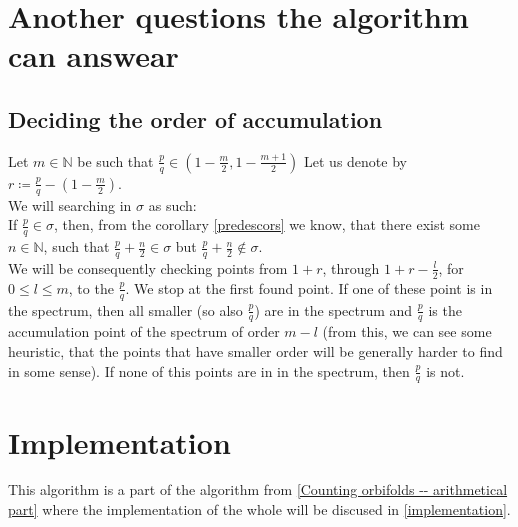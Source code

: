 \section{Another questions the algorithm can answear}
\subsection{Deciding the order of accumulation}
Let $m \in \mathbb{N}$ be such that $\frac{p}{q} \in (1-\frac{m}{2},1-
\frac{m+1}{2})$
Let us denote by $r \coloneqq \frac{p}{q} - (1-\frac{m}{2})$. \\ 

We will searching in $\sigma$ as such: \\

If $\frac{p}{q} \in \sigma$, then, from the corollary \ref{predescors} we know, that there 
exist some $n \in \mathbb{N}$, such that $\frac{p}{q} + \frac{n}{2} \in \sigma$ but 
$\frac{p}{q} + \frac{n}{2} \not\in \sigma$. \\

We will be consequently checking points from $1+r$, through $1+r-\frac{l}{2}$, for 
$0 \leq l \leq m$, to the $\frac{p}{q}$. We stop at the first found point. 
If one of these point is in the spectrum, then all smaller (so also $\frac{p}{q}$) are in 
the spectrum and $\frac{p}{q}$ is the accumulation point of the spectrum of order $m-l$ 
(from this, 
we can see some heuristic, that the points that have smaller order will be generally 
harder to find in some sense). If none of this points are in in the spectrum, then $\frac{p}{q}$ 
is not. \\

\section{Implementation}
This algorithm is a part of the algorithm from \ref{Counting orbifolds -- arithmetical part} 
where the implementation of the whole will be discused in \ref{implementation}.

